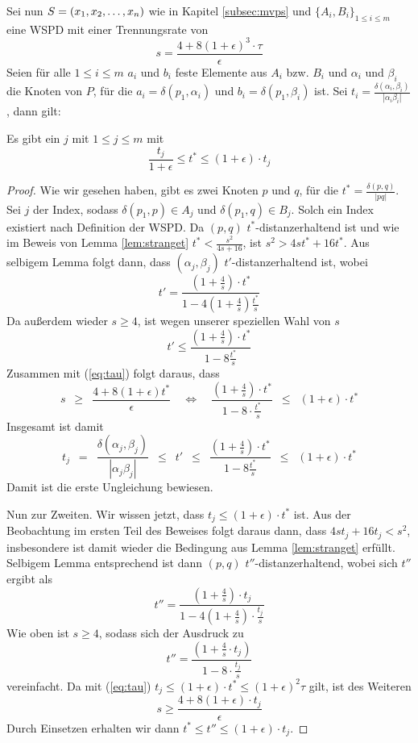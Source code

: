 Sei nun $S = (x_1, x_2, \mathellipsis, x_n)$ wie in Kapitel \ref{subsec:mvps} und $\{A_i, B_i\}_{1 \leq i \leq m}$ eine WSPD mit einer Trennungsrate von 
\[
s = \frac{4 + 8(1 + \epsilon)^3 \cdot \tau}{\epsilon}
\]
Seien für alle $1 \leq i \leq m$ $a_i$ und $b_i$ feste Elemente aus $A_i$ bzw. $B_i$ und $\alpha_i$ und $\beta_i$ die Knoten von $P$, für die $a_i = \delta(p_1, \alpha_i)$ und $b_i = \delta(p_1, \beta_i)$ ist. 
Sei $t_i = \frac{\delta(\alpha_i, \beta_i)}{|\alpha_i \beta_i|}$, dann gilt:
\begin{lemma}
	\label{lem:tstartj}
	Es gibt ein $j$ mit $1 \leq j \leq m$ mit
	\[
		\frac{t_j}{1 + \epsilon} \leq t^* \leq (1 + \epsilon) \cdot t_j
	\]
\end{lemma}
\begin{proof}
	Wie wir gesehen haben, gibt es zwei Knoten $p$ und $q$, für die $t^* = \frac{\delta(p, q)}{|pq|}$. Sei $j$ der Index, sodass $\delta(p_1, p) \in A_j$ und $\delta(p_1, q) \in B_j$. Solch ein Index existiert nach Definition der WSPD. Da $(p, q)$ $t^*$-distanzerhaltend ist und wie im Beweis von Lemma \ref{lem:stranget} $t^* < \frac{s^2}{4s + 16}$, ist $s^2 > 4st^* + 16t^*$. 
	Aus selbigem Lemma folgt dann, dass $(\alpha_j, \beta_j)$ $t'$-distanzerhaltend ist, wobei
	\[
	t' = \frac{(1 + \frac{4}{s}) \cdot t^*}{1 - 4(1 + \frac{4}{s})\frac{t^*}{s}}
	\]
	Da außerdem wieder $s \geq 4$, ist wegen unserer speziellen Wahl von $s$
	\[
	t' \leq \frac{(1 + \frac{4}{s}) \cdot t^*}{1 - 8\frac{t^*}{s}}
	\]
	Zusammen mit (\ref{eq:tau}) folgt daraus, dass 
	\[
	s 
	\enspace\geq\enspace \frac{4 + 8(1 + \epsilon)t^*}{\epsilon} 
	\quad \Leftrightarrow \quad
	\frac{(1 + \frac{4}{s})\cdot t^*}{1 - 8 \cdot \frac{t^*}{s}} 
	\enspace\leq\enspace (1 + \epsilon)\cdot t^*
	\]
	Insgesamt ist damit
	\[
	t_j 
	\enspace = \enspace \frac{\delta(\alpha_j, \beta_j)}{|\alpha_j \beta_j|} 
	\enspace\leq\enspace t' 
	\enspace\leq\enspace \frac{(1 + \frac{4}{s}) \cdot t^*}{1 - 8\frac{t^*}{s}}
	\enspace\leq\enspace (1 + \epsilon)\cdot t^*
	\]
	Damit ist die erste Ungleichung bewiesen.
	
	Nun zur Zweiten. 
	Wir wissen jetzt, dass $t_j \leq (1 + \epsilon) \cdot t^*$ ist.
	Aus der Beobachtung im ersten Teil des Beweises folgt daraus dann, dass $4st_j + 16t_j < s^2$, insbesondere ist damit wieder die Bedingung aus Lemma \ref{lem:stranget} erfüllt.
	Selbigem Lemma entsprechend ist dann $(p, q)$ $t''$-distanzerhaltend, wobei sich $t''$ ergibt als
	\[
	t'' = \frac{(1 + \frac{4}{s})\cdot t_j}{1 - 4 (1 + \frac{4}{s}) \cdot \frac{t_j}{s}}
	\]
	Wie oben ist $s \geq 4$, sodass sich der Ausdruck zu 
	\[
	t'' = \frac{(1 + \frac{4}{s}\cdot t_j)}{1 - 8 \cdot \frac{t_j}{s}}
	\]
	vereinfacht.
	Da mit (\ref{eq:tau}) $t_j \leq (1 + \epsilon) \cdot t^* \leq (1 + \epsilon)^2 \tau$ gilt, ist des Weiteren
	\[
	s \geq \frac{4 + 8 (1 + \epsilon) \cdot t_j}{\epsilon}
	\]
	Durch Einsetzen erhalten wir dann $t^* \leq t'' \leq (1 + \epsilon)\cdot t_j$.
\end{proof}

